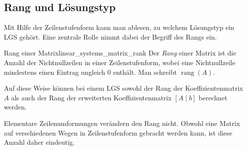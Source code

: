 \subsection{Rang und Lösungstyp}
\label{subsec:linear_systems_solution_criteria}

Mit Hilfe der Zeilenstufenform kann man ablesen, zu welchem Lösungstyp
ein LGS gehört. Eine zentrale Rolle nimmt dabei der Begriff des Rangs ein.

\begin{DefinitionBox}{Rang einer Matrix}{linear_systems_matrix_rank}
  Der \emph{Rang}  einer Matrix ist die Anzahl der
  Nichtnullzeilen in einer Zeilenstufenform, wobei eine Nichtnullzeile
  mindestens einen Eintrag ungleich $0$ enthält. Man schreibt
  $\operatorname{rang}(A)$.
  \begin{center}
  \end{center}
\end{DefinitionBox}

Auf diese Weise können bei einem LGS sowohl der Rang der Koeffizientenmatrix
$A$ als auch der Rang der erweiterten Koeffizientenmatrix $[A\mid b]$
berechnet werden.

Elementare Zeilenumformungen verändern den Rang nicht. Obwohl eine Matrix auf
verschiedenen Wegen in Zeilenstufenform gebracht werden kann, ist diese Anzahl
daher eindeutig.

